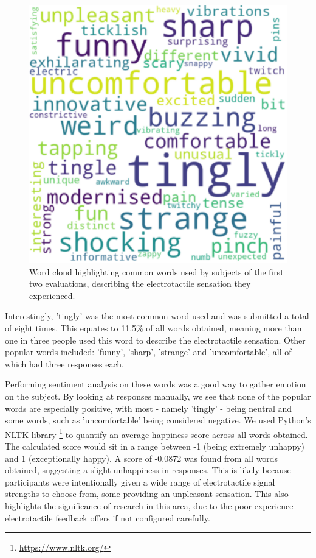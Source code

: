 \documentclass{mpaper}
\begin{document}
\begin{figure}
    \centering
    \includegraphics[scale=0.4]{images/wordmap.pdf}
    \caption{Word cloud highlighting common words used by subjects of the first two evaluations, describing the electrotactile sensation they experienced.}
    \label{fig:word-cloud}
\end{figure}

Interestingly, 'tingly' was the most common word used and was submitted a total of eight times. This equates to 11.5\% of all words obtained, meaning more than one in three people used this word to describe the electrotactile sensation. Other popular words included: 'funny', 'sharp', 'strange' and 'uncomfortable', all of which had three responses each. 

Performing sentiment analysis on these words was a good way to gather emotion on the subject. By looking at responses manually, we see that none of the popular words are especially positive, with most - namely 'tingly' - being neutral and some words, such as 'uncomfortable' being considered negative. We used Python's NLTK library \footnote{\url{https://www.nltk.org/}} to quantify an average happiness score across all words obtained. The calculated score would sit in a range between -1 (being extremely unhappy) and 1 (exceptionally happy). A score of -0.0872 was found from all words obtained, suggesting a slight unhappiness in responses. This is likely because participants were intentionally given a wide range of electrotactile signal strengths to choose from, some providing an unpleasant sensation. This also highlights the significance of research in this area, due to the poor experience electrotactile feedback offers if not configured carefully.\\
\end{document}
